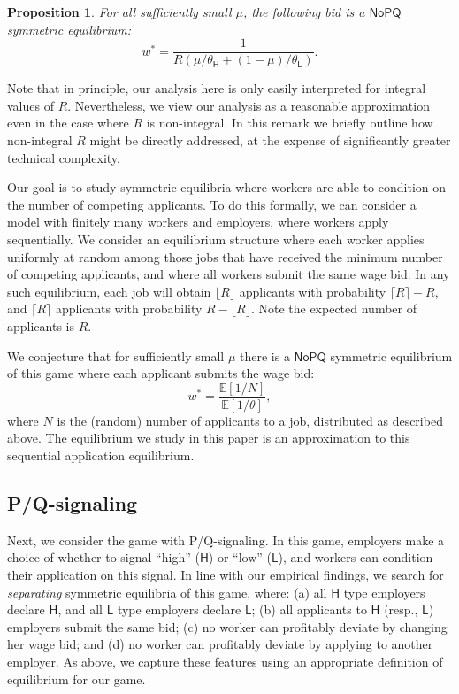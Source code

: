 \documentclass[11pt]{article}
\renewcommand{\H}{\ensuremath{\mathsf{H}}}
\renewcommand{\L}{\ensuremath{\mathsf{L}}}
\newcommand{\NoHT}{\ensuremath{\mathsf{NoPQ}}}
\newcommand{\E}{\ensuremath{\mathbb{E}}}
\newtheorem{prop}{Proposition}
\newcommand{\hottowel}{P/Q-signaling}
\begin{document}
\begin{prop}
\label{prop:noht}
For all sufficiently small $\mu$, the following bid is a $\NoHT$ symmetric equilibrium:
\begin{equation}
\label{eq:noht_eq}
w^* = \frac{1}{R(\mu/\theta_{\H} + (1-\mu)/\theta_{\L})}.
\end{equation}
\end{prop}

\begin{remark}
Note that in principle, our analysis here is only easily interpreted for integral values of $R$.
Nevertheless, we view our analysis as a reasonable approximation even in the case where $R$ is non-integral.
In this remark we briefly outline how non-integral $R$ might be directly addressed, at the expense of significantly greater technical complexity.

Our goal is to study symmetric equilibria where workers are able to condition on the number of competing applicants.
To do this formally, we can consider a model with finitely many workers and employers, where workers apply sequentially.
We consider an equilibrium structure where each worker applies uniformly at random among those jobs that have received the minimum number of competing applicants, and where all workers submit the same wage bid.
In any such equilibrium, each job will obtain $\lfloor R \rfloor$ applicants with probability $\lceil R \rceil - R$, and $\lceil R \rceil$ applicants with probability $R - \lfloor R \rfloor$.
Note the expected number of applicants is $R$.

We conjecture that for sufficiently small $\mu$ there is a $\NoHT$ symmetric equilibrium of this game where each applicant submits the wage bid:
\[ w^* = \frac{\E[1/N]}{\E[1/\theta]},\]
where $N$ is the (random) number of applicants to a job, distributed as described above.
The equilibrium we study in this paper is an approximation to this sequential application equilibrium.
\end{remark}

\subsection{\hottowel}

Next, we consider the game with \hottowel.
In this game, employers make a choice of whether to signal ``high'' ($\H$) or ``low'' ($\L$), and workers can condition their application on this signal.
In line with our empirical findings, we search for {\em separating} symmetric equilibria of this game, where:
(a) all $\H$ type employers declare $\H$, and all $\L$ type employers declare $\L$;
(b) all applicants to $\H$ (resp., $\L$) employers submit the same bid;
(c) no worker can profitably deviate by changing her wage bid; and
(d) no worker can profitably deviate by applying to another employer.
As above, we capture these features using an appropriate definition of equilibrium for our game.
\end{document}
